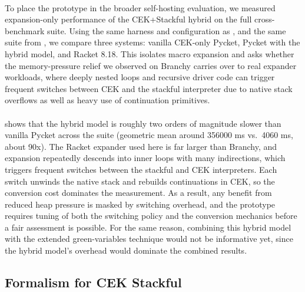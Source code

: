       \paragraph{}%
        To place the prototype in the broader self-hosting evaluation, we measured expansion-only performance of the CEK+Stackful hybrid on the full cross-benchmark suite. Using the same harness and configuration as , and the same suite from , we compare three systems: vanilla CEK-only Pycket, Pycket with the hybrid model, and Racket 8.18. This isolates macro expansion and asks whether the memory-pressure relief we observed on Branchy carries over to real expander workloads, where deeply nested loops and recursive driver code can trigger frequent switches between CEK and the stackful interpreter due to native stack overflows as well as heavy use of continuation primitives.


      \paragraph{}%
         shows that the hybrid model is roughly two orders of magnitude slower than vanilla Pycket across the suite (geometric mean around 356000 ms vs.\ 4060 ms, about 90x). The Racket expander used here is far larger than Branchy, and expansion repeatedly descends into inner loops with many indirections, which triggers frequent switches between the stackful and CEK interpreters. Each switch unwinds the native stack and rebuilds continuations in CEK, so the conversion cost dominates the measurement. As a result, any benefit from reduced heap pressure is masked by switching overhead, and the prototype requires tuning of both the switching policy and the conversion mechanics before a fair assessment is possible. For the same reason, combining this hybrid model with the extended green-variables technique would not be informative yet, since the hybrid model’s overhead would dominate the combined results.


    \subsection{Formalism for CEK \+ Stackful}



